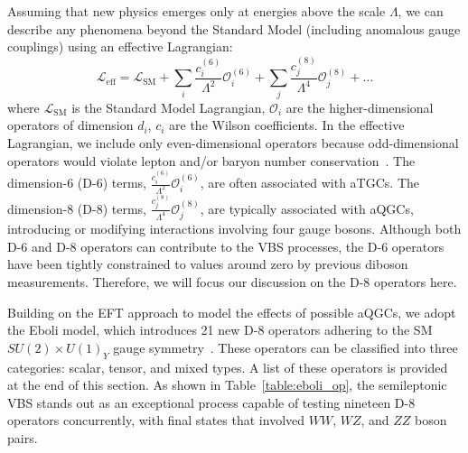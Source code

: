 Assuming that new physics emerges only at energies above the scale $\Lambda$, we can describe any phenomena beyond the Standard Model (including anomalous gauge couplings) using an effective Lagrangian:
\begin{equation}
\mathcal{L}_{\text{eff}} = \mathcal{L}_{\text{SM}} + \sum_i \frac{c^{(6)}_i}{\Lambda^2} \mathcal{O}^{(6)}_i + \sum_j \frac{c^{(8)}_j}{\Lambda^4} \mathcal{O}^{(8)}_j + \ldots
\end{equation} 
where $\mathcal{L}_{\text{SM}}$ is the Standard Model Lagrangian, $\mathcal{O}_i$ are the higher-dimensional operators of dimension $d_i$, $c_i$ are the Wilson coefficients.
In the effective Lagrangian, we include only even-dimensional operators because odd-dimensional operators would violate lepton and/or baryon number conservation~\cite{Degrande_2013}. 
The dimension-6 (D-6) terms, $\frac{c^{(6)}_i}{\Lambda^2} \mathcal{O}^{(6)}_i$, are often associated with aTGCs. 
The dimension-8 (D-8) terms, $\frac{c^{(8)}_j}{\Lambda^4} \mathcal{O}^{(8)}_j$, are typically associated with aQGCs, introducing or modifying interactions involving four gauge bosons.
Although both D-6 and D-8 operators can contribute to the VBS processes, the D-6 operators have been tightly constrained to values around zero by previous diboson measurements. Therefore, we will focus our discussion on the D-8 operators here.


Building on the EFT approach to model the effects of possible aQGCs, we adopt the Eboli model, which introduces 21 new D-8 operators adhering to the SM $SU(2)\times U(1)_Y$ gauge symmetry~\cite{eboli2006p}.
These operators can be classified into three categories: scalar, tensor, and mixed types. A list of these operators is provided at the end of this section.
As shown in Table~\ref{table:eboli_op}, the semileptonic VBS stands out as an exceptional process capable of testing nineteen D-8 operators concurrently, with final states that involved $WW$, $WZ$, and $ZZ$ boson pairs.


